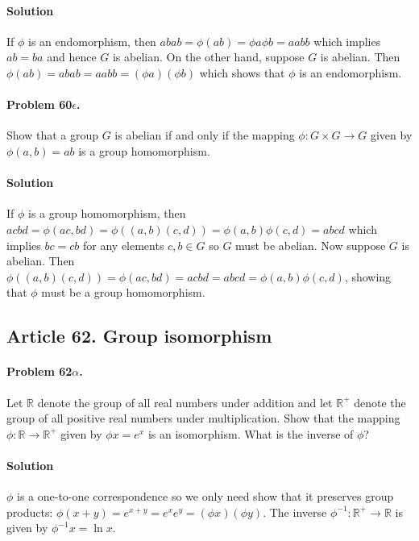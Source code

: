 \paragraph*{Solution}
If $\phi$ is an endomorphism, then $abab = \phi(ab) = \phi a \phi b = aabb$ which
implies $ab = ba$ and hence $G$ is abelian. On the other hand, suppose $G$ is
abelian. Then $\phi (ab) = abab = aabb = (\phi a)(\phi b)$ which shows that $\phi$
is an endomorphism.

\paragraph{Problem 60$\epsilon$.}
Show that a group $G$ is abelian if and only if the mapping $\phi : G \times G \rightarrow
G$ given by $\phi (a,b) = ab$ is a group homomorphism.

\paragraph*{Solution}
If $\phi$ is a group homomorphism, then $acbd = \phi(ac,bd) = \phi((a,b)(c,d))
= \phi(a,b)\phi(c,d) = abcd$ which implies $bc = cb$ for any elements $c,b \in G$
so $G$ must be abelian. Now suppose $G$ is abelian. Then $\phi ((a,b)(c,d)) =
\phi (ac,bd) = acbd = abcd = \phi(a,b)\phi(c,d)$, showing that $\phi$ must be
a group homomorphism.


\subsection{Article 62. Group isomorphism}

\paragraph{Problem 62$\alpha$.}
Let $\mathbb{R}$ denote the group of all real numbers under addition and let
$\mathbb{R}^+$ denote the group of all positive real numbers under multiplication.
Show that the mapping $\phi : \mathbb{R} \rightarrow \mathbb{R}^+$ given by
$\phi x = e^x$ is an isomorphism. What is the inverse of $\phi$?

\paragraph*{Solution}
$\phi$ is a one-to-one correspondence so we only need show that it preserves group products:
$\phi(x+y) = e^{x+y} = e^x e^y = (\phi x)(\phi y)$. The inverse $\phi^{-1}: \mathbb{R}^+
\rightarrow \mathbb{R}$ is given by $\phi^{-1} x = \ln x$.

